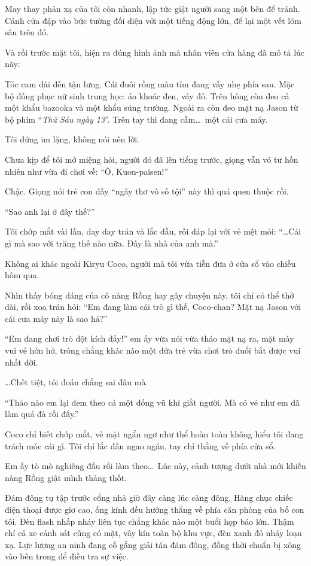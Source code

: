 \documentclass[../main.tex]{subfiles}
\begin{document}
May thay phản xạ của tôi còn nhanh, lập tức giật người sang một bên để tránh. Cánh cửa đập vào bức tường đối diện với một tiếng động lớn, để lại một vết lõm sâu trên đó.

Và rồi trước mặt tôi, hiện ra đúng hình ảnh mà nhân viên cửa hàng đã mô tả lúc nãy:

Tóc cam dài đến tận lưng. Cái đuôi rồng màu tím đang vẫy nhẹ phía sau. Mặc bộ đồng phục nữ sinh trung học: áo khoác đen, váy đỏ. Trên hông còn đeo cả một khẩu bazooka và một khẩu súng trường. Ngoài ra còn đeo mặt nạ Jason từ bộ phim ``\textit{Thứ Sáu ngày 13}''. Trên tay thì đang cầm\dots\ một cái cưa máy.

Tôi đứng im lặng, không nói nên lời.


Chưa kịp để tôi mở miệng hỏi, người đó đã lên tiếng trước, giọng vẫn vô tư hồn nhiên như vừa đi chơi về: ``Ô, Kuon-paisen!''

Chậc. Giọng nói trẻ con đầy ``ngây thơ vô số tội'' này thì quá quen thuộc rồi.

``Sao anh lại ở đây thế?''

Tôi chớp mắt vài lần, day day trán và lắc đầu, rồi đáp lại với vẻ mệt mỏi: ``\dots Cái gì mà sao với trăng thế nào nữa. Đây là nhà của anh mà.''

Không ai khác ngoài Kiryu Coco, người mà tôi vừa tiễn đưa ở cửa sổ vào chiều hôm qua.

Nhìn thấy bóng dáng của cô nàng Rồng hay gây chuyện này, tôi chỉ có thể thở dài, rồi xoa trán hỏi: ``Em đang làm cái trò gì thế, Coco-chan? Mặt nạ Jason với cái cưa máy này là sao hả?''

``Em đang chơi trò đột kích đấy!'' em ấy vừa nói vừa tháo mặt nạ ra, mặt mày vui vẻ hớn hở, trông chẳng khác nào một đứa trẻ vừa chơi trò đuổi bắt được vui nhất đời.

\dots Chết tiệt, tôi đoán chẳng sai đâu mà.

``Thảo nào em lại đem theo cả một đống vũ khí giắt người. Mà có vẻ như em đã làm quá đà rồi đấy.''

Coco chỉ biết chớp mắt, vẻ mặt ngẩn ngơ như thể hoàn toàn không hiểu tôi đang trách móc cái gì. Tôi chỉ lắc đầu ngao ngán, tay chỉ thẳng về phía cửa sổ.

Em ấy tò mò nghiêng đầu rồi làm theo\dots\ Lúc này, cảnh tượng dưới nhà mới khiến nàng Rồng giật mình thảng thốt.

Đám đông tụ tập trước cổng nhà giờ đây càng lúc càng đông. Hàng chục chiếc điện thoại được giơ cao, ống kính đều hướng thẳng về phía căn phòng của bố con tôi. Đèn flash nhấp nháy liên tục chẳng khác nào một buổi họp báo lớn. Thậm chí cả xe cảnh sát cũng có mặt, vây kín toàn bộ khu vực, đèn xanh đỏ nháy loạn xạ. Lực lượng an ninh đang cố gắng giải tán đám đông, đồng thời chuẩn bị xông vào bên trong để điều tra sự việc.
\end{document}
